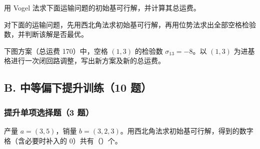  用 Vogel 法求下面运输问题的初始基可行解，并计算其总运费。
\begin{center}\end{center}

 对下面的运输问题，先用西北角法求初始基可行解，再用位势法求出全部空格检验数，并判断该解是否最优。
\begin{center}\end{center}

 下图方案（总运费 170）中，空格 $(1,3)$ 的检验数 $\sigma_{13}=-8$。以 $(1,3)$ 为进基格进行一次闭回路调整，写出新方案及新的总运费。
\begin{center}\end{center}

\subsection*{B. 中等偏下提升训练（10 题）}
\subsubsection*{提升单项选择题（3 题）}
 产量 $a=(3,5)$，销量 $b=(3,2,3)$。用西北角法求初始基可行解，得到的数字格（含必要时补入的 0）共有（\quad）个。
\par\noindent\begin{minipage}{0.55\linewidth}\end{minipage}\hfill\begin{minipage}{0.42\linewidth}\centering
{}\end{minipage}

